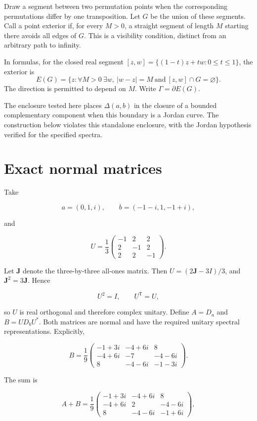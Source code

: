 \documentclass[11pt]{article}
\begin{document}
Draw a segment between two permutation points when the corresponding
permutations differ by one transposition. Let \(G\) be the union of
these segments. Call a point exterior if, for every \(M>0\), a straight
segment of length \(M\) starting there avoids all edges of \(G\).
This is a visibility condition, distinct from an arbitrary path to infinity.

In formulas, for the closed real segment $[z,w]=\{(1-t)z+tw:0\le t\le1\}$, the exterior is
\[
 E(G)=\{z:\forall M>0\ \exists w,\ |w-z|=M\ \text{and}\ [z,w]\cap G=\varnothing\}.
\]
The direction is permitted to depend on $M$. Write $\Gamma=\partial E(G)$.

The enclosure tested here places \(\Delta(a,b)\) in the closure of a
bounded complementary component when this boundary is a Jordan curve.
The construction below violates this standalone enclosure, with the
Jordan hypothesis verified for the specified spectra.

\section{Exact normal matrices}\label{exact-normal-matrices}

Take

\[
a=(0,1,i),\qquad b=(-1-i,1,-1+i),
\]

and

\[
U=\frac13
\begin{pmatrix}
-1&2&2\\
2&-1&2\\
2&2&-1
\end{pmatrix}.
\]

Let \(\mathbf{J}\) denote the three-by-three all-ones matrix. Then
\(U=(2\mathbf J-3I)/3\), and \(\mathbf J^2=3\mathbf J\). Hence

\[
U^2=I,\qquad U^{\mathsf T}=U,
\]

so \(U\) is real orthogonal and therefore complex unitary. Define
\(A=D_a\) and \(B=UD_bU^*\). Both matrices are normal and have the
required unitary spectral representations. Explicitly,

\[
B=\frac19
\begin{pmatrix}
-1+3i&-4+6i&8\\
-4+6i&-7&-4-6i\\
8&-4-6i&-1-3i
\end{pmatrix}.
\]

The sum is

\[
A+B=\frac19
\begin{pmatrix}
-1+3i&-4+6i&8\\
-4+6i&2&-4-6i\\
8&-4-6i&-1+6i
\end{pmatrix},
\]
\end{document}
